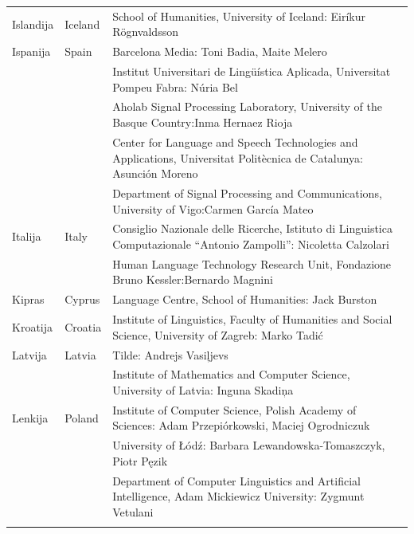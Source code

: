 \begin{longtable}{llp{105mm}}
  Islandija & \textcolor{grey1}{Iceland} & School of Humanities, University of Iceland: Eiríkur Rögnvaldsson\\ \addlinespace
  
  Ispanija & \textcolor{grey1}{Spain} & Barcelona Media: Toni Badia, Maite Melero \\ \addlinespace 
  & & Institut Universitari de Lingüística Aplicada, Universitat Pompeu Fabra: Núria Bel \\ \addlinespace 
  & & Aholab Signal Processing Laboratory, University of the Basque Country:\newline Inma Hernaez Rioja \\ \addlinespace 
  & & Center for Language and Speech Technologies and Applications, Universitat Politècnica de Catalunya:  Asunción Moreno \\ \addlinespace 
  & & Department of Signal Processing and Communications, University of Vigo:\newline Carmen García Mateo \\ \addlinespace 
  
  Italija & \textcolor{grey1}{Italy} & Consiglio Nazionale delle Ricerche, Istituto di Linguistica Computazionale “Antonio Zampolli”: Nicoletta Calzolari\\ \addlinespace
  & & Human Language Technology Research Unit, Fondazione Bruno Kessler:\newline Bernardo Magnini\\ \addlinespace
  
  Kipras & \textcolor{grey1}{Cyprus} &  Language Centre, School of Humanities: Jack Burston\\ \addlinespace
  
  Kroatija & \textcolor{grey1}{Croatia} & Institute of Linguistics, Faculty of Humanities and Social Science, University of Zagreb: Marko Tadić \\ \addlinespace
  
  Latvija & \textcolor{grey1}{Latvia} & Tilde: Andrejs Vasiļjevs\\ \addlinespace 
  & & Institute of Mathematics and Computer Science, University of Latvia: Inguna Skadiņa\\ \addlinespace
               
  Lenkija & \textcolor{grey1}{Poland} & Institute of Computer Science, Polish Academy of Sciences: Adam Przepiórkowski, Maciej Ogrodniczuk \\ \addlinespace
  & & University of Łódź: Barbara Lewandowska-Tomaszczyk, Piotr Pęzik\\ \addlinespace
  & & Department of Computer Linguistics and Artificial Intelligence, Adam Mickiewicz University: Zygmunt Vetulani \\ \addlinespace
  

\end{longtable}
